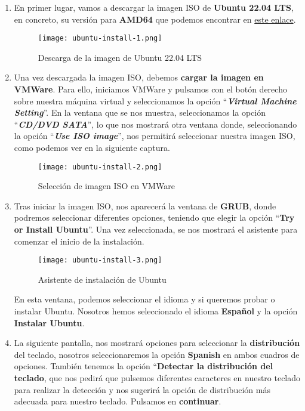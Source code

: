 \begin{enumerate}
    \item En primer lugar, vamos a descargar la imagen ISO de \textbf{Ubuntu 22.04 LTS}, en concreto, su versión para \textbf{AMD64} que podemos encontrar en \href{https://releases.ubuntu.com/jammy/}{este enlace}.

    \begin{figure}[H]
        \centering
        \texttt{[image: ubuntu-install-1.png]}
        \caption{Descarga de la imagen de Ubuntu 22.04 LTS}
    \end{figure}

    \item Una vez descargada la imagen ISO, debemos \textbf{cargar la imagen en VMWare}. Para ello, iniciamos VMWare y pulsamos con el botón derecho sobre nuestra máquina virtual y seleccionamos la opción ``\textit{\textbf{Virtual Machine Setting}}''. En la ventana que se nos muestra, seleccionamos la opción ``\textit{\textbf{CD/DVD SATA}}'', lo que nos mostrará otra ventana donde, seleccionando la opción ``\textit{\textbf{Use ISO image}}'', nos permitirá seleccionar nuestra imagen ISO, como podemos ver en la siguiente captura.

    \begin{figure}[H]
        \centering
        \texttt{[image: ubuntu-install-2.png]}
        \caption{Selección de imagen ISO en VMWare}
    \end{figure}

    \item Tras iniciar la imagen ISO, nos aparecerá la ventana de \textbf{GRUB}, donde podremos seleccionar diferentes opciones, teniendo que elegir la opción ``\textbf{Try or Install Ubuntu}''. Una vez seleccionada, se nos mostrará el asistente para comenzar el inicio de la instalación.

    \begin{figure}[H]
        \centering
        \texttt{[image: ubuntu-install-3.png]}
        \caption{Asistente de instalación de Ubuntu}
    \end{figure}

    En esta ventana, podemos seleccionar el idioma y si queremos probar o instalar Ubuntu. Nosotros hemos seleccionado
    el idioma \textbf{Español} y la opción \textbf{Instalar Ubuntu}.


    \item La siguiente pantalla, nos mostrará opciones para seleccionar la \textbf{distribución} del teclado, nosotros seleccionaremos la opción \textbf{Spanish} en ambos cuadros de opciones. También tenemos la opción ``\textbf{Detectar la distribución del teclado}, que nos pedirá que pulsemos diferentes caracteres en nuestro teclado para realizar la detección y nos sugerirá la opción de distribución más adecuada para nuestro teclado. Pulsamos en \textbf{continuar}.


\end{enumerate}
